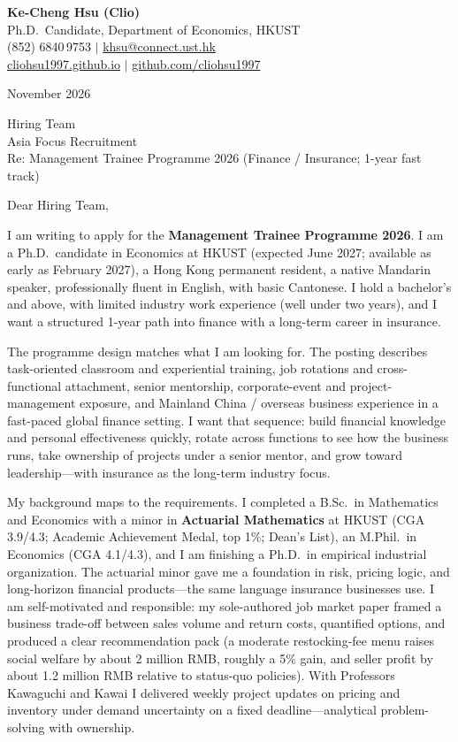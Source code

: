 \documentclass[11pt,letterpaper]{article}
\begin{document}
\noindent
{\bfseries Ke-Cheng Hsu (Clio)}\\
Ph.D.\ Candidate, Department of Economics, HKUST\\
(852) 6840\,9753 \quad $|$ \quad \href{mailto:khsu@connect.ust.hk}{khsu@connect.ust.hk}\\
\href{https://cliohsu1997.github.io/}{cliohsu1997.github.io} \quad $|$ \quad \href{https://github.com/cliohsu1997}{github.com/cliohsu1997}

\vspace{0.3em}
 November 2026

\vspace{0.2em}
\noindent
Hiring Team\\
Asia Focus Recruitment\\
Re: Management Trainee Programme 2026 (Finance / Insurance; 1-year fast track)

\vspace{0.08em}
Dear Hiring Team,

I am writing to apply for the \textbf{Management Trainee Programme 2026}. I am a Ph.D.\ candidate in Economics at HKUST (expected June 2027; available as early as February 2027), a Hong Kong permanent resident, a native Mandarin speaker, professionally fluent in English, with basic Cantonese. I hold a bachelor's and above, with limited industry work experience (well under two years), and I want a structured 1-year path into finance with a long-term career in insurance.

The programme design matches what I am looking for. The posting describes task-oriented classroom and experiential training, job rotations and cross-functional attachment, senior mentorship, corporate-event and project-management exposure, and Mainland China / overseas business experience in a fast-paced global finance setting. I want that sequence: build financial knowledge and personal effectiveness quickly, rotate across functions to see how the business runs, take ownership of projects under a senior mentor, and grow toward leadership---with insurance as the long-term industry focus.

My background maps to the requirements. I completed a B.Sc.\ in Mathematics and Economics with a minor in \textbf{Actuarial Mathematics} at HKUST (CGA 3.9/4.3; Academic Achievement Medal, top 1\%; Dean's List), an M.Phil.\ in Economics (CGA 4.1/4.3), and I am finishing a Ph.D.\ in empirical industrial organization. The actuarial minor gave me a foundation in risk, pricing logic, and long-horizon financial products---the same language insurance businesses use. I am self-motivated and responsible: my sole-authored job market paper framed a business trade-off between sales volume and return costs, quantified options, and produced a clear recommendation pack (a moderate restocking-fee menu raises social welfare by about 2 million RMB, roughly a 5\% gain, and seller profit by about 1.2 million RMB relative to status-quo policies). With Professors Kawaguchi and Kawai I delivered weekly project updates on pricing and inventory under demand uncertainty on a fixed deadline---analytical problem-solving with ownership.
\end{document}
